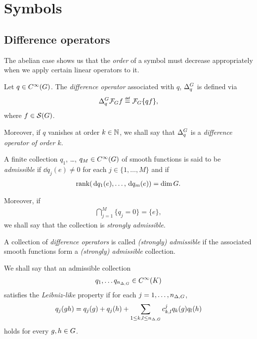 \chapter{Symbols}
\label{chapter:symbols}

\section{Difference operators}

The abelian case shows us that the \emph{order} of a symbol
must decrease appropriately when we apply certain linear operators to it.

\begin{definition}
\label{definition:difference_operators}
    Let $q \in {C^\infty(G)}$.
    The \emph{difference operator} associated with $q$, ${\Delta^{G}_{q}}$ is defined via
    \begin{align*}
        \DifferenceOperator{q} \Fourier f \defeq \Fourier\{q f\},
    \end{align*}
    where $f \in {\mathcal{S} (G)}$.

    Moreover, if $q$ vanishes at order $k \in \mathbb{N}$,
    we shall say that ${\Delta^{G}_{q}}$ is a \emph{difference operator of order $k$}.
\end{definition}

\begin{definition}
\label{definition:admissibility_of_difference_operators}
    A finite collection $q_1$, \dots, $q_M \in {C^\infty(G)}$ of smooth functions is said to be \emph{admissible}
    if $\dd q_j(e) \neq 0$ for each $j \in \{1, \dots, M\}$
    and if
    \begin{align*}
        \operatorname{rank}(\,\mathrm{d} q_1(e), \dots, \,\mathrm{d} q_m(e)) = \dim G.
    \end{align*}

    Moreover, if
    \begin{align*}
        \bigcap_{j = 1}^M \{ q_j = 0 \} = \{e\},
    \end{align*}
    we shall say that the collection is \emph{strongly admissible}.

    A collection of \emph{difference operators} is called \emph{(strongly) admissible}
    if the associated smooth functions form a \emph{(strongly) admissible} collection.
\end{definition}

\begin{definition}
\label{definition:Leibniz-like_property_for_smooth_functions}
    We shall say that an admissible collection
    \begin{align*}
        q_1, \dots q_{{n_{\Delta, G}}} \in {C^\infty(K)}
    \end{align*}
    satisfies the \emph{Leibniz-like} property
    if for each $j = 1, \dots, {n_{\Delta, G}}$,
    \begin{align*}
        q_j(g h) = q_j(g) + q_j(h) + \sum_{1 \leq k, l \leq {n_{\Delta, G}}} c^j_{k, l} q_k(g) q_l(h)
    \end{align*}
    holds for every $g, h \in G$.
\end{definition}

